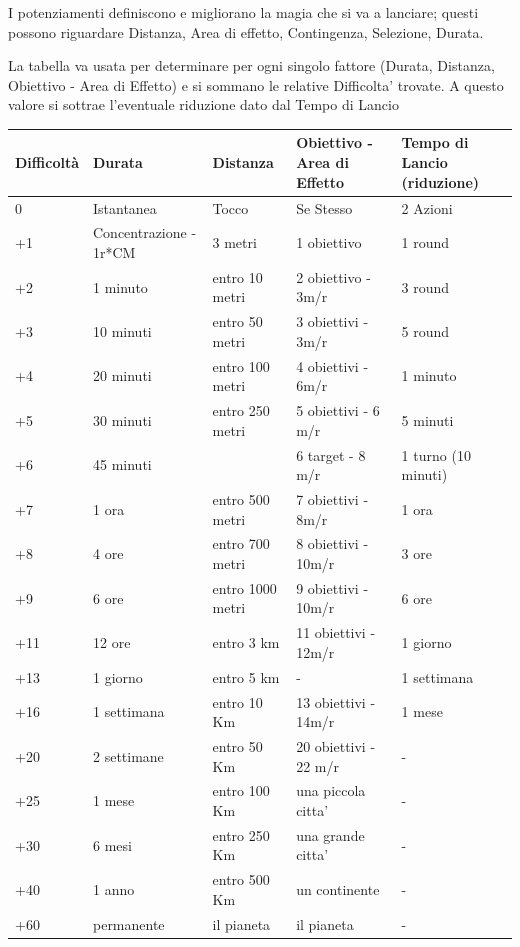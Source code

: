 \documentclass[a4paper,11pt,twoside,openany]{book}
\begin{document}
\label{potenziamenti-delle-caratteristiche-dellessenza}

I potenziamenti definiscono e migliorano la magia che si va a lanciare; questi possono riguardare Distanza, Area di effetto, Contingenza, Selezione, Durata.

La tabella va usata per determinare per ogni singolo fattore (Durata, Distanza, Obiettivo - Area di Effetto) e si sommano le relative Difficolta' trovate.
A questo valore si sottrae l'eventuale riduzione dato dal Tempo di Lancio

\begin{tabularx}{\textwidth}{XXXXX}
	\hline
\textbf{Difficoltà} &\textbf{Durata} &\textbf{Distanza} &\textbf{Obiettivo - Area di Effetto} &\textbf{Tempo di Lancio (riduzione)} \\
\hline
0	& Istantanea				& Tocco			& Se Stesso				& 2 Azioni\\
\hline
+1	& Concentrazione - 1r*CM	& 3 metri		& 1 obiettivo				& 1 round\\
\hline
+2	& 1 minuto					& entro 10 metri&2 obiettivo - 3m/r		& 3 round\\
\hline
+3	&	10 minuti				& entro 50 metri& 3 obiettivi - 3m/r	& 5 round\\
\hline
+4	& 20 minuti					& entro 100 metri&4 obiettivi - 6m/r&1 minuto\\
\hline
+5&30 minuti&entro 250 metri&5 obiettivi - 6 m/r&5 minuti\\
\hline
+6&45 minuti&&6 target - 8 m/r&1 turno (10 minuti)\\
\hline
+7&1 ora&entro 500 metri&7 obiettivi - 8m/r&1 ora\\
\hline
+8&4 ore&entro 700 metri&8 obiettivi - 10m/r&3 ore\\
\hline
+9&6 ore&entro 1000 metri&9 obiettivi - 10m/r&6 ore\\
\hline	
+11&12 ore&entro 3 km&11 obiettivi - 12m/r&1 giorno\\
\hline	
+13&1 giorno&entro 5 km&-&1 settimana\\
\hline	
+16&1 settimana&entro 10 Km&13 obiettivi - 14m/r&1 mese\\
\hline	
+20&2 settimane&entro 50 Km&20 obiettivi - 22 m/r&-\\
\hline	
+25&1 mese&entro 100 Km&una piccola citta'&-\\
\hline	
+30&6 mesi&entro 250 Km&una grande citta'&-\\
\hline	
+40&1 anno&entro 500 Km&un continente&-\\
\hline	
+60&permanente&il pianeta&il pianeta&-\\
\hline	
\end{tabularx}
\end{document}
